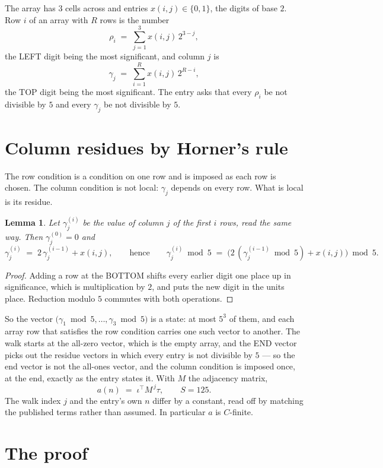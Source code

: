 \documentclass[11pt,a4paper]{article}
\theoremstyle{plain}
\newtheorem{lemma}[theorem]{Lemma}
\theoremstyle{definition}
\begin{document}
The array has $3$ cells across and entries $x(i,j)\in\{0,1\}$, the digits of
base $2$. Row $i$ of an array with $R$ rows is the number
\[
\rho_i\;=\;\sum_{j=1}^{3}x(i,j)\,2^{3-j} ,
\]
the LEFT digit being the most significant, and column $j$ is
\[
\gamma_j\;=\;\sum_{i=1}^{R}x(i,j)\,2^{R-i} ,
\]
the TOP digit being the most significant. The entry asks that every $\rho_i$ be not divisible by
$5$ and every $\gamma_j$ be not divisible by $5$.


\section{Column residues by Horner's rule}

The row condition is a condition on one row and is imposed as each row is chosen. The column
condition is not local: $\gamma_j$ depends on every row. What is local is its residue.

\begin{lemma}\label{lem:horner}
Let $\gamma_j^{(i)}$ be the value of column $j$ of the first $i$ rows, read the same way.
Then $\gamma_j^{(0)}=0$ and
\[
\gamma_j^{(i)}\;=\;2\,\gamma_j^{(i-1)}+x(i,j),
\qquad\text{hence}\qquad
\gamma_j^{(i)}\bmod 5\;=\;
\bigl(2\,(\gamma_j^{(i-1)}\bmod 5)+x(i,j)\bigr)\bmod 5 .
\]
\end{lemma}

\begin{proof}
Adding a row at the BOTTOM shifts every earlier digit one place up in significance, which is
multiplication by $2$, and puts the new digit in the units place. Reduction modulo
$5$ commutes with both operations.
\end{proof}

So the vector $\bigl(\gamma_1\bmod 5,\dots,\gamma_{3}\bmod
5\bigr)$ is a state: at most $5^{3}$ of them, and each array row
that satisfies the row condition carries one such vector to another. The walk starts at the
all-zero vector, which is the empty array, and the END vector picks out the residue vectors in
which every entry is not divisible by $5$ --- so the end vector is not the all-ones
vector, and the column condition is imposed once, at the end, exactly as the entry states it.
With $M$ the adjacency matrix,
\[
a(n)\;=\;\iota^{\!\top}M^{\,j}\tau ,\qquad S=125.
\]
The walk index $j$ and the entry's own $n$ differ by a constant, read off by matching the
published terms rather than assumed. In particular $a$ is $C$-finite.

\section{The proof}
\end{document}
